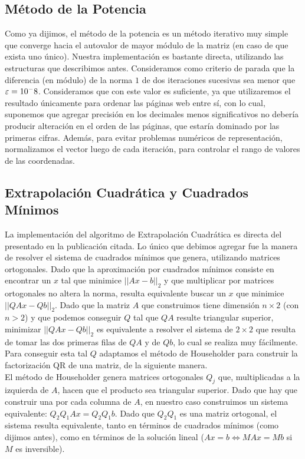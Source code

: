 \subsection{Método de la Potencia}
Como ya dijimos, el método de la potencia es un método iterativo muy simple que converge hacia el autovalor de mayor módulo de la matriz (en caso de que exista uno único). Nuestra implementación es bastante directa, utilizando las estructuras que describimos antes. Consideramos como criterio de parada que la diferencia (en módulo) de la norma $1$ de dos iteraciones sucesivas sea menor que $\varepsilon = 10^-{8}$. Consideramos que con este valor es suficiente, ya que utilizaremos el resultado únicamente para ordenar las páginas web entre sí, con lo cual, suponemos que agregar precisión en los decimales menos significativos no debería producir alteración en el orden de las páginas, que estaría dominado por las primeras cifras. Además, para evitar problemas numéricos de representación, normalizamos el vector luego de cada iteración, para controlar el rango de valores de las coordenadas.

\subsection{Extrapolación Cuadrática y Cuadrados Mínimos}
La implementación del algoritmo de Extrapolación Cuadrática es directa del presentado en la publicación citada. Lo único que debimos agregar fue la manera de resolver el sistema de cuadrados mínimos que genera, utilizando matrices ortogonales. Dado que la aproximación por cuadrados mínimos consiste en encontrar un $x$ tal que minimice $||Ax-b||_2$ y que multiplicar por matrices ortogonales no altera la norma, resulta equivalente buscar un $x$ que minimice $||QAx -Qb||_2$. Dado que la matriz $A$ que construimos tiene dimensión $n\times 2$ (con $n > 2$) y que podemos conseguir $Q$ tal que $QA$ resulte triangular superior, minimizar $||QAx -Qb||_2$ es equivalente a resolver el sistema de $2\times 2$ que resulta de tomar las dos primeras filas de $QA$ y de $Qb$, lo cual se realiza muy fácilmente. Para conseguir esta tal $Q$ adaptamos el método de Householder para construir la factorización QR de una matriz, de la siguiente manera.\\ 

El método de Householder genera matrices ortogonales $Q_j$ que, multiplicadas a la izquierda de $A$, hacen que el producto sea triangular superior. Dado que hay que construir una por cada columna de $A$, en nuestro caso construimos un sistema equivalente: $Q_2 Q_1 A x = Q_2 Q_1 b$. Dado que $Q_2 Q_1$ es una matriz ortogonal, el sistema resulta equivalente, tanto en términos de cuadrados mínimos (como dijimos antes), como en términos de la solución lineal ($Ax = b \Leftrightarrow MAx = Mb$ si $M$ es inversible). \\

